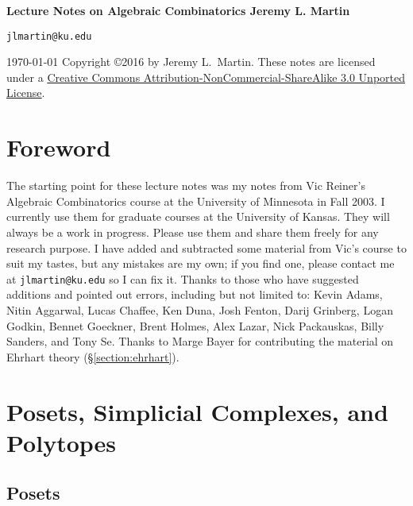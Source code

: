 

\parskip=0bp
\thispagestyle{empty}

\begin{center}
\vfill
\huge\bf
Lecture Notes on Algebraic Combinatorics\rm
\vfill\LARGE
Jeremy L. Martin
\medskip

{\tt jlmartin@ku.edu}
\medskip

\today
\vfill
\normalsize
Copyright \copyright 2016 by Jeremy L.\ Martin.  These notes are
licensed under
a \href{http://creativecommons.org/licenses/by-nc-sa/3.0/deed.en_US}
{Creative Commons Attribution-NonCommercial-ShareAlike 3.0 Unported License}.
\end{center}
\pagebreak
\parskip=10bp
\section*{Foreword}
The starting point for these lecture notes was my notes from Vic
Reiner's Algebraic Combinatorics course at the University of Minnesota
in Fall 2003.  I currently use them for graduate courses at the
University of Kansas.  They will always be a work in
progress.  Please use them and share them freely for any research
purpose.  I have added and subtracted some material from Vic's course
to suit my tastes, but any mistakes are my own; if you find one,
please contact me at {\tt jlmartin@ku.edu} so I can fix it.
Thanks to those who have suggested additions and pointed out errors,
including but not limited to: Kevin Adams, Nitin Aggarwal, Lucas Chaffee, Ken Duna, Josh Fenton, Darij Grinberg, Logan Godkin, Bennet Goeckner, Brent Holmes, Alex Lazar, Nick Packauskas, Billy Sanders, and Tony Se.  Thanks to Marge Bayer for contributing the material on Ehrhart theory (\S\ref{section:ehrhart}).
\pagebreak


\section{Posets, Simplicial Complexes, and Polytopes}

\subsection{Posets}

